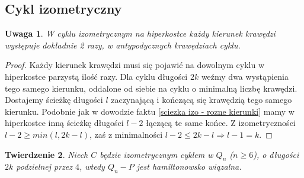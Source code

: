 \documentclass{pracamgr}
\newtheorem{theorem}{Twierdzenie}[chapter]
\newtheorem{remark}[theorem]{Uwaga}
\begin{document}
   \subsection{Cykl izometryczny}
    \begin{remark}\label{cykl izometryczny - drugie pol powtorka}
     W cyklu izometrycznym na hiperkostce każdy kierunek krawędzi występuje dokładnie 2 razy, w antypodycznych krawędziach cyklu.
    \end{remark}
    \begin{proof}
     Każdy kierunek krawędzi musi się pojawić na dowolnym cyklu w hiperkostce parzystą ilość razy. Dla cyklu długości $2k$
     weźmy dwa wystąpienia tego samego kierunku, oddalone od siebie na cyklu o minimalną liczbę krawędzi. Dostajemy ścieżkę długości $l$ zaczynającą
     i kończącą się krawędzią tego samego kierunku. Podobnie jak w dowodzie faktu \ref{sciezka izo - rozne kierunki} mamy w hiperkostce
     inną ścieżkę długości $l-2$ łączącą te same końce. Z izometryczności $l-2\ge min(l,2k-l)$, zaś z minimalności $l-2\le 2k-l\Rightarrow l-1=k$.
    \end{proof}
    \begin{theorem}\label{hamilton - cykl, parz}
     Niech $C$ będzie izometrycznym cyklem w $Q_n$ ($n\ge6$), o długości $2k$ podzielnej przez $4$, wtedy $Q_n-P$ jest hamiltonowsko wiązalna.
    \end{theorem}
\end{document}

